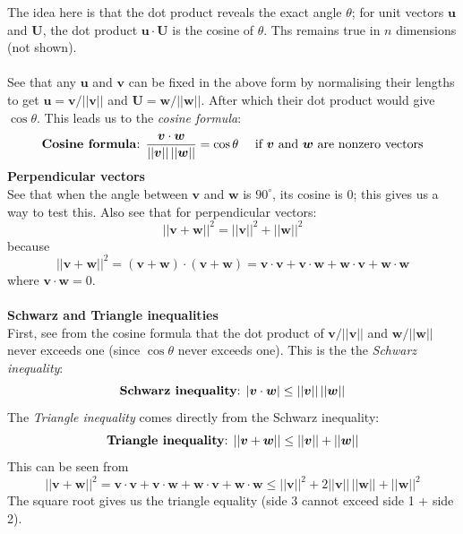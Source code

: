 \documentclass{report}
\begin{document}
The idea here is that the dot product reveals the exact angle $\theta$; for unit vectors $\bm u$ and $\bm U$, the dot product $\bm u\cdot\bm U$ is the cosine of 
$\theta$. Ths remains true in $n$ dimensions (not shown).\\
\vspace{1mm}\\
See that any $\bm{u}$ and $\bm{v}$ can be fixed in the above form by normalising their lengths to get
$\bm u=\bm v/||\bm v||$ and $\bm U=\bm w/||\bm w||$. After which their dot product would give $\cos\theta$. This leads us to the \textit{cosine formula}:
\begin{equation*}
\text{\textbf{Cosine formula}: }
\frac{\bm v\cdot\bm w}{||\bm v||\,||\bm w||}=\cos\theta\quad\text{ if $\bm v$ and $\bm w$ are nonzero vectors}
\end{equation*}
\textbf{Perpendicular vectors}\\
See that when the angle between $\bm v$ and $\bm w$ is $90^\circ$, its cosine is 0; this gives us a way to test this. Also see that for perpendicular vectors:
\begin{equation*}
||\bm v+\bm w||^2=||\bm v||^2+||\bm w||^2
\end{equation*}
because
\begin{equation*}
||\bm v+\bm w||^2=(\bm v+\bm w)\cdot(\bm v+\bm w)=\bm v\cdot\bm v+\bm v\cdot\bm w+\bm w\cdot\bm v+\bm w\cdot\bm w
\end{equation*}
where $\bm v\cdot \bm w=0$.\\
\vspace{1mm}\\
\textbf{Schwarz and Triangle inequalities}\\
First, see from the cosine formula that the dot product of $\bm v/||\bm v||$ and
$\bm w/||\bm w||$ never exceeds one (since $\cos\theta$ never exceeds one). This is the the 
\textit{Schwarz inequality}:
\begin{equation*}
\text{\textbf{Schwarz inequality}: }|\bm v\cdot\bm w|\leq||\bm v||\,||\bm w||
\end{equation*}
The \textit{Triangle inequality} comes directly from the Schwarz inequality:
\begin{equation*}
\text{\textbf{Triangle inequality}: }||\bm v+\bm w||\leq||\bm v||+||\bm w||
\end{equation*}
This can be seen from
\begin{equation*}
||\bm v+\bm w||^2=\bm v\cdot\bm v+\bm v\cdot\bm w+\bm w\cdot\bm v+\bm w\cdot\bm w
\leq||\bm v||^2+2||\bm v||\,||\bm w||+||\bm w||^2
\end{equation*}
The square root gives us the triangle equality (side 3 cannot exceed side 1 + side 2).
\newpage

\section{}
\end{document}
